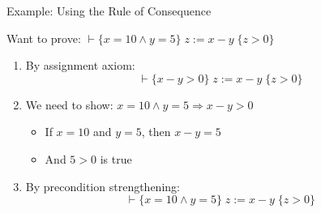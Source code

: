 \begin{frame}{Example: Using the Rule of Consequence}
    \begin{example}
        Want to prove: $\vdash \{x = 10 \wedge y = 5\} \; z := x - y \; \{z > 0\}$

        \begin{enumerate}
            \item By assignment axiom:
            \[\vdash \{x - y > 0\} \; z := x - y \; \{z > 0\}\]

            \item We need to show: $x = 10 \wedge y = 5 \Rightarrow x - y > 0$
            \begin{itemize}
                \item If $x = 10$ and $y = 5$, then $x - y = 5$
                \item And $5 > 0$ is true
            \end{itemize}

            \item By precondition strengthening:
            \[\vdash \{x = 10 \wedge y = 5\} \; z := x - y \; \{z > 0\}\]
        \end{enumerate}
    \end{example}
\end{frame}

